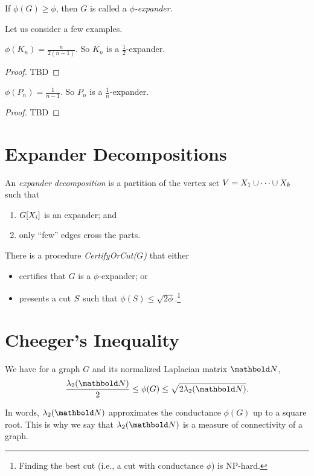 \begin{defn}[Expander] If $\phi(G) \geq \phi$, then $G$ is called a \emph{$\phi$-expander}.
\end{defn}

Let us consider a few examples.

\begin{lem}
$\phi(K_n) = \frac{n}{2(n-1)}$. So $K_n$ is a $\frac{1}{2}$-expander.
\end{lem}
\begin{proof}
TBD
\end{proof}

\begin{lem}
$\phi(P_n) = \frac{1}{n-1}$. So $P_n$ is a $\frac{1}{n}$-expander.
\end{lem}
\begin{proof}
TBD
\end{proof}

\section{Expander Decompositions}

\begin{defn} An \emph{expander decomposition} is a partition of the vertex set $V = X_1 \cup \dots \cup X_k$ such that \begin{enumerate}
    \item $G[X_i]$ is an expander; and
    \item only ``few'' edges cross the parts.
\end{enumerate}
\end{defn}\noindent There is a procedure \emph{CertifyOrCut($G$)} that either \begin{itemize}
    \item certifies that $G$ is a $\phi$-expander; or
    \item presents a cut $S$ such that $\phi(S) \leq \sqrt{2\phi}$.\footnote{Finding the best cut (i.e., a cut with conductance $\phi$) is NP-hard.}
\end{itemize}

\section{Cheeger's Inequality}

\begin{thm} We have for a graph $G$ and its normalized Laplacian matrix $\mN$, \begin{align}
    \frac{\lambda_2(\mN)}{2} \leq \phi(G) \leq \sqrt{2 \lambda_2(\mN)}.
\end{align}
\end{thm}\noindent In words, $\lambda_2(\mN)$ approximates the conductance $\phi(G)$ up to a square root. This is why we say that $\lambda_2(\mN)$ is a measure of connectivity of a graph.

